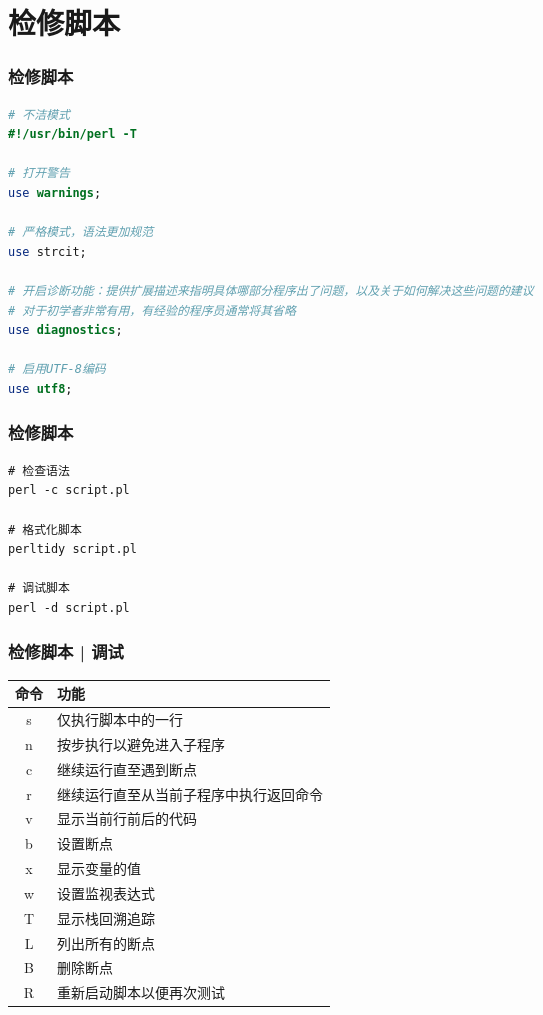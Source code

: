 \section{检修脚本}
\begin{frame}[fragile]
  \frametitle{\alert{检修脚本}}
  \vspace{-1.5em}
\begin{lstlisting}[language=Perl,basicstyle=\small\tt]
# 不洁模式
#!/usr/bin/perl -T

# 打开警告
use warnings;

# 严格模式，语法更加规范
use strcit;

# 开启诊断功能：提供扩展描述来指明具体哪部分程序出了问题，以及关于如何解决这些问题的建议
# 对于初学者非常有用，有经验的程序员通常将其省略
use diagnostics;

# 启用UTF-8编码
use utf8;
\end{lstlisting}
\end{frame}

\begin{frame}[fragile]
  \frametitle{\alert{检修脚本}}
\begin{lstlisting}
# 检查语法
perl -c script.pl

# 格式化脚本
perltidy script.pl

# 调试脚本
perl -d script.pl
\end{lstlisting}
\end{frame}

\begin{frame}
  \frametitle{检修脚本 | 调试}
  \begin{table}
    \centering
    \begin{tabularx}{0.8\textwidth}{cX}
      \hline
      \rowcolor{blue!50}命令 & 功能\\
      \hline
      s & 仅执行脚本中的一行\\
      n & 按步执行以避免进入子程序\\
      c & 继续运行直至遇到断点\\
      r & 继续运行直至从当前子程序中执行返回命令\\
      v & 显示当前行前后的代码\\
      b & 设置断点\\
      x & 显示变量的值\\
      w & 设置监视表达式\\
      T & 显示栈回溯追踪\\
      L & 列出所有的断点\\
      B & 删除断点\\
      R & 重新启动脚本以便再次测试\\
      \hline
    \end{tabularx}
  \end{table}
\end{frame}

